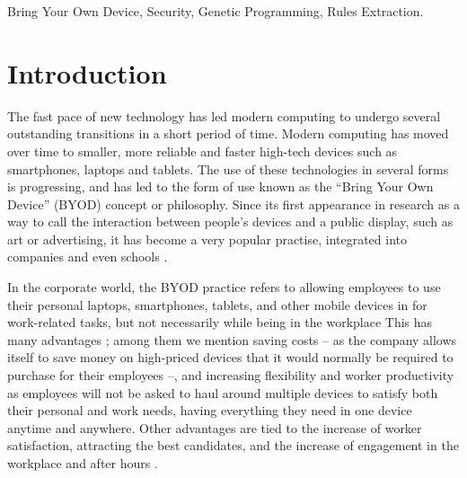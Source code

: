 \documentclass[a4paper,10pt,twocolumn,preprint,3p]{elsarticle}
\begin{document}
\begin{frontmatter}
\begin{keyword}
Bring Your Own Device, Security, Genetic Programming, Rules Extraction. 
\end{keyword}

\end{frontmatter}


\section{Introduction}
\label{sec:intro}

The fast pace of new technology has led modern computing to undergo
several outstanding transitions in a short period of time. Modern
computing has moved over time to smaller, more reliable and faster
high-tech devices such as smartphones, laptops and tablets. The use of
these technologies in several forms is progressing, and has led to the
form of use known as the ``Bring Your Own Device'' (BYOD) concept or
philosophy. %
Since its first appearance in research
\cite{ballagas2004byod} as a way to call the interaction between
people's devices and a public display, such as art or advertising, it
has become a very popular practise, integrated into companies
\cite{thomson2012byod} and even schools \cite{song2014bring}.  

In the corporate world, the BYOD
practice refers to allowing employees to use their
personal laptops, smartphones, tablets, and other mobile devices in
for work-related tasks, but not necessarily while being in the workplace This has many
advantages \cite{singh2012byod}; among them we mention saving costs --
as the company allows itself to save money on high-priced devices that
it would normally be required to purchase for their employees --, and
increasing flexibility and worker productivity as employees will not
be asked to haul around multiple devices to satisfy both their personal and
work needs, having everything they need in one device anytime and
anywhere. 
Other advantages are tied to the increase of worker satisfaction, attracting the best candidates, and the increase of engagement in the workplace and after hours \cite{singh2012byod}. 
\end{document}
